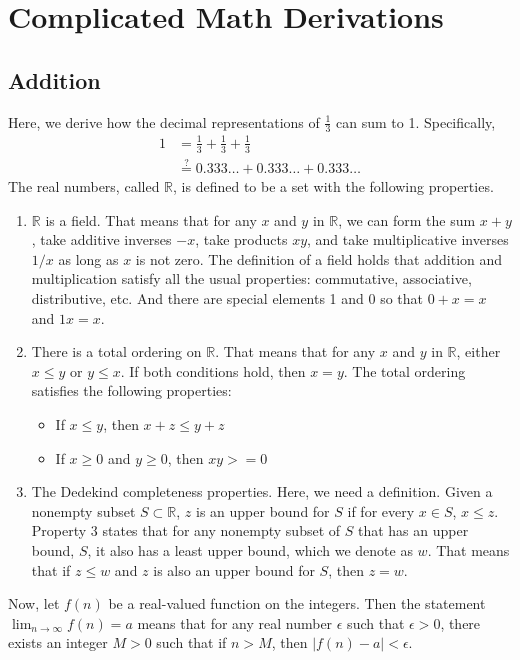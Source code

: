 \chapter{Complicated Math Derivations}\label{app}
\section{Addition}
\label{app22}
Here, we derive how the decimal representations of $\frac{1}{3}$ can sum to 1. Specifically,
\begin{align}
1 &= \frac{1}{3}+\frac{1}{3}+\frac{1}{3}\\
&\stackrel{?}{=} 0.333\dotsc  +0.333\dotsc + 0.333\dotsc
\end{align}
The real numbers, called $\mathbb{R}$, is defined to be a set with the following properties.
\begin{enumerate}
\item $\mathbb{R}$ is a field. That means that for any $x$ and $y$ in $\mathbb{R}$, we can form the sum $x+y$, take additive inverses $-x$, take products $xy$, and take multiplicative inverses $1/x$ as long as $x$ is not zero. The definition of a field holds that addition and multiplication satisfy all the usual properties: commutative, associative, distributive, etc. And there are special elements 1 and 0 so that $0+x = x$ and $1x = x$.

\item There is a total ordering on $\mathbb{R}$. That means that for any $x$ and $y$ in $\mathbb{R}$, either $x \leq y$ or $y \leq x$. If both conditions hold, then $x = y$. The total ordering satisfies the following properties:
\begin{itemize}
\item If $x \leq y$, then $x+z \leq y+z$
\item If $x \geq 0$ and $y \geq 0$, then $xy >= 0$
\end{itemize}

\item The Dedekind completeness properties. Here, we need a definition. Given a nonempty subset $S \subset\mathbb{R}$, $z$ is an upper bound for $S$ if for every $x \in S$, $x \leq z$. Property 3 states that for any nonempty subset of $S$ that has an upper bound, $S$, it also has a least upper bound, which we denote as $w$. That means that if $z \leq w$ and $z$ is also an upper bound for $S$, then $z = w$.
\end{enumerate}

Now, let $f(n)$ be a real-valued function on the integers. Then the statement $\lim_{n \to \infty}f(n) = a$ means that for any real number $\epsilon$ such that $\epsilon > 0$, there exists an integer $M > 0$ such that if $n > M$, then $|f(n) - a| < \epsilon$.

